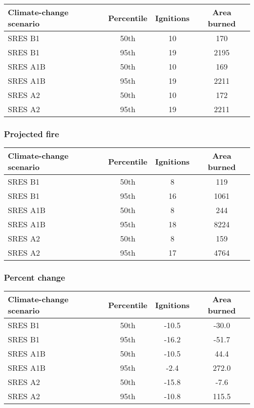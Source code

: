 \documentclass{article}\usepackage[]{graphicx}\usepackage[]{color}
\newcommand{\headcol}{\rowcolor{tableheadcolor}}
\begin{document}
\begin{table}[ht]
\centering
\begin{tabular}{lccc}
  \headcol 
 \toprule
Climate-change scenario & Percentile & Ignitions & Area burned \\ 
  \midrule
SRES B1 & 50th & 10 & 170 \\ 
  SRES B1 & 95th & 19 & 2195 \\ 
  SRES A1B & 50th & 10 & 169 \\ 
  SRES A1B & 95th & 19 & 2211 \\ 
  SRES A2 & 50th & 10 & 172 \\ 
  SRES A2 & 95th & 19 & 2211 \\ 
   \bottomrule
\end{tabular}
\end{table}


\subsubsection{Projected fire}

\begin{table}[ht]
\centering
\begin{tabular}{lccc}
  \headcol 
 \toprule
Climate-change scenario & Percentile & Ignitions & Area burned \\ 
  \midrule
SRES B1 & 50th & 8 & 119 \\ 
  SRES B1 & 95th & 16 & 1061 \\ 
  SRES A1B & 50th & 8 & 244 \\ 
  SRES A1B & 95th & 18 & 8224 \\ 
  SRES A2 & 50th & 8 & 159 \\ 
  SRES A2 & 95th & 17 & 4764 \\ 
   \bottomrule
\end{tabular}
\end{table}


\subsubsection{Percent change}

\begin{table}[ht]
\centering
\begin{tabular}{lccc}
  \headcol 
 \toprule
Climate-change scenario & Percentile & Ignitions & Area burned \\ 
  \midrule
SRES B1 & 50th & -10.5 & -30.0 \\ 
  SRES B1 & 95th & -16.2 & -51.7 \\ 
  SRES A1B & 50th & -10.5 & 44.4 \\ 
  SRES A1B & 95th & -2.4 & 272.0 \\ 
  SRES A2 & 50th & -15.8 & -7.6 \\ 
  SRES A2 & 95th & -10.8 & 115.5 \\ 
   \bottomrule
\end{tabular}
\end{table}
\end{document}
